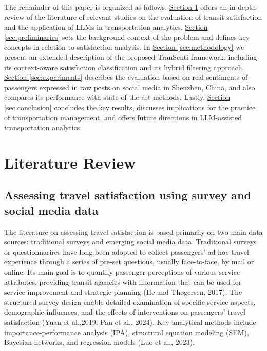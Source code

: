 \documentclass[a4paper,fleqn,12pt]{cas-sc}
\begin{document}
The remainder of this paper is organized as follows. \hyperref[sec:liter]{Section \ref{sec:liter}} offers an in-depth review of the literature of relevant studies on the evaluation of transit satisfaction and the application of LLMs in transportation analytics. \hyperref[sec:preliminaries]{Section \ref{sec:preliminaries}} sets the background context of the problem and defines key concepts in relation to satisfaction analysis. In \hyperref[sec:methodology]{Section \ref{sec:methodology}} we present an extended description of the proposed TranSenti framework, including its context-aware satisfaction classification and its hybrid filtering approach.  \hyperref[sec:experiments]{Section \ref{sec:experiments}} describes the evaluation based on real sentiments of passengers expressed in raw posts on social media in Shenzhen, China, and also compares its performance with state-of-the-art methods. Lastly, \hyperref[sec:conclusion]{Section \ref{sec:conclusion}} concludes the key results, discusses implications for the practice of transportation management, and offers future directions in LLM-assisted transportation analytics.

\section{Literature Review}\label{sec:liter}

\subsection{Assessing travel satisfaction using survey and social media data}
The literature on assessing travel satisfaction is based primarily on two main data sources: traditional surveys and emerging social media data. Traditional surveys or questionnarires have long been adopted to collect passengers’ ad-hoc travel experience through a series of pre-set questions, usually face-to-face, by mail or online. Its main goal is to quantify passenger perceptions of various service attributes, providing transit agencies with information that can be used for service improvement and strategic planning (He and Thøgersen, 2017). The structured survey design enable detailed examination of specific service aspects, demographic influences, and the effects of interventions on passengers’ travel satisfaction (Yuan et al.,2019; Pan et al., 2024). Key analytical methods include importance-performance analysis (IPA), structural equation modeling (SEM), Bayesian networks, and regression models (Luo et al., 2023).
\end{document}
